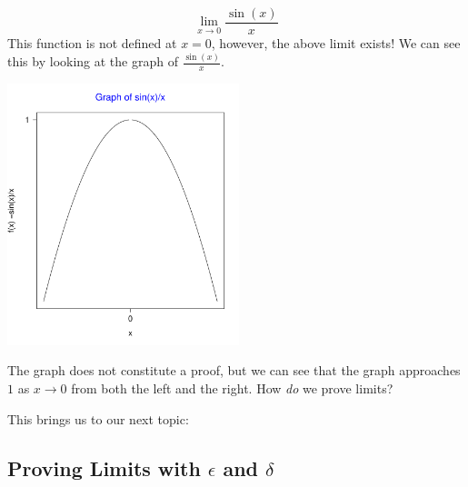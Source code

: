 \documentclass[12pt,a4paper]{article} %
\begin{document}
\begin{equation}
\lim_{x\rightarrow 0}\frac{\sin(x)}{x}
\end{equation}
This function is not defined at $x=0$, however, the above limit exists!  We can see this by looking at the graph of $\frac{\sin(x)}{x}$.  

\includegraphics[height=3in]{sinxoverx.pdf}

The graph does not constitute a proof, but we can see that the graph approaches $1$ as $x\rightarrow 0$ from both the left and the right.    How \emph{do} we prove limits?


This brings us to our next topic:

\subsection{Proving Limits with $\epsilon$ and $\delta$}
\end{document}
